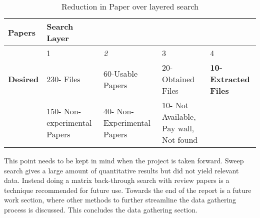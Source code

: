 \begin{table}[h]
\caption{Reduction in Paper over layered search}
\begin{adjustbox}{width=1\textwidth}
\begin{tabular}{l|l|lll}
\cline{1-2}
\multicolumn{1}{|l|}{\textbf{Papers}} & \textbf{Search Layer}        & \textbf{}                                        &                                                                &                                                  \\ \hline
                                      & 1                            & \multicolumn{1}{l|}{\textit{2}}                  & \multicolumn{1}{l|}{3}                                         & \multicolumn{1}{l|}{4}                           \\
\textbf{Desired}                      & 230- Files                   & \multicolumn{1}{l|}{60-Usable Papers}            & \multicolumn{1}{l|}{20-Obtained Files}                         & \multicolumn{1}{l|}{\textbf{10-Extracted Files}} \\
                                      & 150- Non-experimental Papers & \multicolumn{1}{l|}{40- Non-Experimental Papers} & \multicolumn{1}{l|}{10- Not Available, Pay wall, Not found} & \multicolumn{1}{l|}{}                           
\end{tabular}
\end{adjustbox}
\label{tab:searchList}
\end{table}

This point needs to be kept in mind when the project is taken forward. Sweep search gives a large amount of quantitative results but did not yield relevant data. Instead doing a matrix back-through search with review papers is a technique recommended for future use. Towards the end of the report is a future work section, where other methods to further streamline the data gathering process is discussed. 
This concludes the data gathering section. 
\newpage



